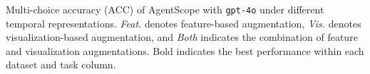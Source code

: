 \begin{table}[htbp]
\caption{Multi-choice accuracy (ACC) of AgentScope with \texttt{gpt-4o} under different temporal representations.
\textit{Feat.} denotes feature-based augmentation, \textit{Vis.} denotes visualization-based augmentation, and \textit{Both} indicates the combination of feature and visualization augmentations.
Bold indicates the best performance within each dataset and task column.}
\label{tab:feature_visual_ablation}

\end{table}
\vspace{-20pt}








